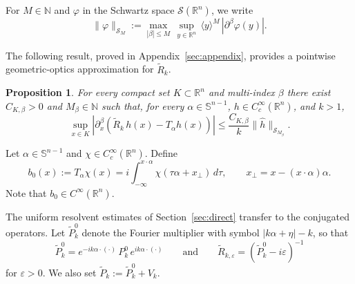 \documentclass[12pt,a4paper]{amsart}
\numberwithin{equation}{section}
\theoremstyle{plain}
\newtheorem{proposition}[theorem]{Proposition}
\theoremstyle{definition}
\begin{document}
For $M\in\mathbb{N}$ and $\varphi$ in the Schwartz space
$\mathscr{S}(\mathbb{R}^n)$, we write
\begin{equation*}
    \|\varphi\|_{\mathscr{S}_M}
    :=
    \max_{|\beta|\leq M}\,
    \sup_{y\in\mathbb{R}^n}\,
    \langle y\rangle^{M}\,
    |\partial^\beta\varphi(y)|.
\end{equation*}


The following result, proved in Appendix~\ref{sec:appendix}, provides
a pointwise geometric-optics approximation for $\widetilde{R}_k$.




\begin{proposition}\label{lem:GO_ptwise}
For every compact set $K\subset\mathbb{R}^n$ and multi-index $\beta$ there exist $C_{K,\beta}>0$ and $M_{\beta}\in\mathbb{N}$ such that, for every $\alpha\in\mathbb{S}^{n-1}$, $h\in C_c^\infty(\mathbb{R}^n)$, and $k> 1$,
\begin{equation}\label{eq:GO_main}
  \sup_{x\in K}\left|
    \partial_x^\beta\!\left(\widetilde{R}_k\, h(x) - T_\alpha h(x)\right)
  \right|
  \leq \frac{C_{K,\beta}}{k}\|\widehat{h}\|_{\mathscr{S}_{M_{\beta}}}.
\end{equation}
\end{proposition}

Let $\alpha\in\mathbb{S}^{n-1}$ and $\chi\in C_c^\infty(\mathbb{R}^n)$. Define
\begin{equation}\label{eq:b0_def}
    b_0(x) := T_\alpha \chi(x)
    = i \int_{-\infty}^{x \cdot \alpha}
    \chi(\tau\alpha + x_\perp)\, d\tau,
    \qquad x_\perp = x - (x \cdot \alpha)\alpha.
\end{equation}
Note that $b_0 \in C^\infty(\mathbb{R}^n)$.


The uniform resolvent estimates of Section~\ref{sec:direct} transfer to the
conjugated operators. Let $\widetilde{P}^0_k$ denote the Fourier multiplier
with symbol $|k\alpha+\eta|-k$, so that
\begin{equation}\label{eq:tildR_tildP0}
    \widetilde{P}^0_k = e^{-ik\alpha\cdot (\cdot)}\,P^0_k\, e^{ik\alpha\cdot(\cdot)}
    \qquad
    \text{and}
    \qquad
    \widetilde R_{k,\varepsilon}
    =
    (\widetilde P_k^0-i\varepsilon)^{-1}
\end{equation}
for $\varepsilon>0$. We also set $\widetilde{P}_k := \widetilde{P}^0_k + V_k$.
\end{document}
